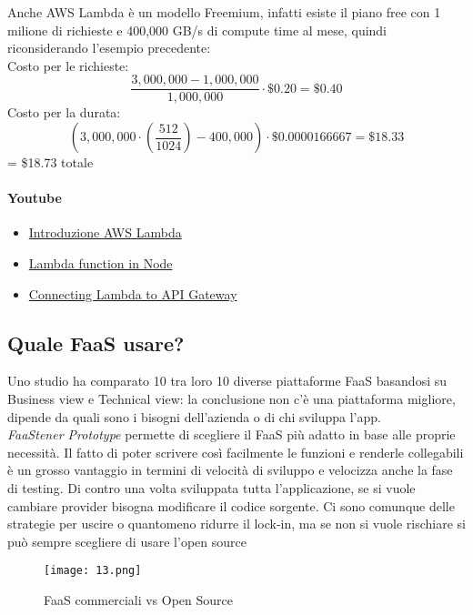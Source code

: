 Anche AWS Lambda è un modello Freemium, infatti esiste il piano free con 1 milione di richieste e 400,000 GB/s di compute time al mese, quindi riconsiderando l'esempio precedente:\\
Costo per le richieste: $$\frac{3,000,000 - 1,000,000}{1,000,000} \cdot \$0.20 = \$0.40$$
Costo per la durata: $$ (3,000,000 \cdot ( \frac{512}{1024} ) - 400,000) \cdot \$0.0000166667 = \$18.33 $$
= \$18.73 totale

\paragraph{Youtube}
\begin{itemize}
    \item \href{https://www.youtube.com/watch?v=eOBq__h4OJ4}{Introduzione AWS Lambda}
    \item \href{https://www.youtube.com/watch?v=PEatXsXIkLc}{Lambda function in Node}
    \item \href{https://www.youtube.com/watch?v=DSrg7hG-jV4}{Connecting Lambda to API Gateway}
\end{itemize}

\subsection{Quale FaaS usare?}
Uno studio ha comparato 10 tra loro 10 diverse piattaforme FaaS basandosi su Business view e Technical view: la conclusione non c'è una piattaforma migliore, dipende da quali sono i bisogni dell’azienda o di chi sviluppa l’app.\\
\textit{FaaStener Prototype} permette di scegliere il FaaS più adatto in base alle proprie necessità. Il fatto di poter scrivere così facilmente le funzioni e renderle collegabili è un grosso vantaggio in termini di velocità di sviluppo e velocizza anche la fase di testing. 
Di contro una volta sviluppata tutta l’applicazione, se si vuole cambiare provider bisogna modificare il codice sorgente. Ci sono comunque delle strategie per uscire o quantomeno ridurre il lock-in, ma se non si vuole rischiare si può sempre scegliere di usare l’open source

\newpage
\begin{figure}[h!]
    \centering
    \texttt{[image: 13.png]}
    \caption{FaaS commerciali vs Open Source}
\end{figure}

